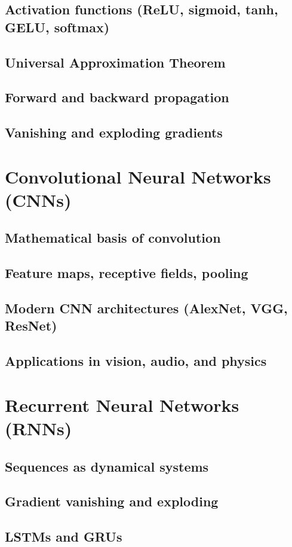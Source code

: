 \section{Activation functions (ReLU, sigmoid, tanh, GELU, softmax)}
\section{Universal Approximation Theorem}
\section{Forward and backward propagation}
\section{Vanishing and exploding gradients}

\chapter{Convolutional Neural Networks (CNNs)}
\section{Mathematical basis of convolution}
\section{Feature maps, receptive fields, pooling}
\section{Modern CNN architectures (AlexNet, VGG, ResNet)}
\section{Applications in vision, audio, and physics}

\chapter{Recurrent Neural Networks (RNNs)}
\section{Sequences as dynamical systems}
\section{Gradient vanishing and exploding}
\section{LSTMs and GRUs}
